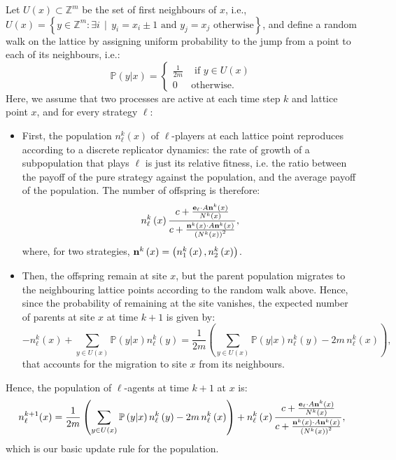 Let $U\left(x\right)\subset\mathbb{Z}^{m}$ be the set of first neighbours
of $x$, i.e., $U\left(x\right)=\left\{ y\in\mathbb{Z}^{m}:\exists i\,\mid\,y_{i}=x_{i}\pm1\text{ and }y_{j}=x_{j}\text{ otherwise}\right\} $,
and define a random walk on the lattice by assigning uniform probability
to the jump from a point to each of its neighbours, i.e.:
\[
\mathbb{P}\left(y|x\right)=\begin{cases}
\frac{1}{2m} & \text{ if }y\in U(x)\\
0 & \text{otherwise}.
\end{cases}
\]
Here, we assume that two processes are active at each time step $k$
and lattice point $x$, and for every strategy $\ell$: 
\begin{itemize}
\item First, the population $n_{\ell}^{k}\left(x\right)$ of $\ell$-players
at each lattice point reproduces according to a discrete replicator
dynamics: the rate of growth of a subpopulation that plays $\ell$
is just its relative fitness, i.e. the ratio between the payoff of
the pure strategy against the population, and the average payoff of
the population. The number of offspring is therefore: 
\[
n_{\ell}^{k}\left(x\right)\frac{c+\frac{{\bf e}_{\ell}\cdot A{\bf n}^{k}\left(x\right)}{N^{k}\left(x\right)}}{c+\frac{{\bf n}^{k}\left(x\right)\cdot A{\bf n}^{k}\left(x\right)}{\left(N^{k}\left(x\right)\right)^{2}}},
\]
where, for two strategies, ${\bf n}^{k}\left(x\right)=\left(n_{1}^{k}\left(x\right),n_{2}^{k}\left(x\right)\right)$.
\item Then, the offspring remain at site $x$, but the parent population
migrates to the neighbouring lattice points according to the random
walk above. Hence, since the probability of remaining at the site
vanishes, the expected number of parents at site $x$ at time $k+1$
is given by:
\[
-n_{\ell}^{k}(x)+\sum_{y\in U(x)}\mathbb{P}\left(y|x\right)n_{\ell}^{k}\left(y\right)=\frac{1}{2m}\left(\sum_{y\in U(x)}\mathbb{P}\left(y|x\right)n_{\ell}^{k}\left(y\right)-2m\,n_{\ell}^{k}\left(x\right)\right),
\]
that accounts for the migration to site $x$ from its neighbours.
\end{itemize}
Hence, the population of $\ell$-agents at time $k+1$ at $x$ is:
\[
n_{\ell}^{k+1}(x)=\frac{1}{2m}\left(\sum_{y\in U(x)}\mathbb{P}\left(y|x\right)n_{\ell}^{k}\left(y\right)-2m\,n_{\ell}^{k}\left(x\right)\right)+n_{\ell}^{k}\left(x\right)\frac{c+\frac{{\bf e}_{\ell}\cdot A{\bf n}^{k}\left(x\right)}{N^{k}\left(x\right)}}{c+\frac{{\bf n}^{k}\left(x\right)\cdot A{\bf n}^{k}\left(x\right)}{\left(N^{k}\left(x\right)\right)^{2}}},
\]
which is our basic update rule for the population.

